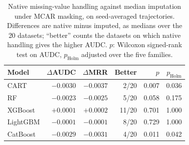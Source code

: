\begin{table}[t]
\centering
\small
\caption{Native missing-value handling against median imputation under MCAR masking, on seed-averaged trajectories. Differences are native minus imputed, as medians over the 20 datasets; ``better'' counts the datasets on which native handling gives the higher AUDC. $p$: Wilcoxon signed-rank test on AUDC, $p_{\mathrm{Holm}}$ adjusted over the five families.}
\label{tab:native}
\begin{tabular}{@{}lrrrrr@{}}
\toprule
Model & $\Delta$AUDC & $\Delta$MRR & Better & $p$ & $p_{\mathrm{Holm}}$ \\
\midrule
CART & $-0.0030$ & $-0.0037$ & 2/20 & 0.007 & 0.036 \\
RF & $-0.0023$ & $-0.0025$ & 5/20 & 0.058 & 0.175 \\
XGBoost & $+0.0001$ & $+0.0002$ & 11/20 & 0.701 & 1.000 \\
LightGBM & $-0.0001$ & $-0.0001$ & 8/20 & 0.729 & 1.000 \\
CatBoost & $-0.0029$ & $-0.0031$ & 4/20 & 0.011 & 0.042 \\
\bottomrule
\end{tabular}
\end{table}
